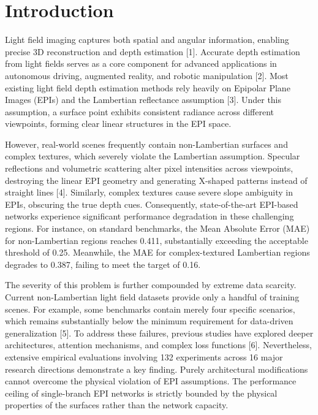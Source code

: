 \section{Introduction}

Light field imaging captures both spatial and angular information, enabling precise 3D reconstruction and depth estimation [1]. Accurate depth estimation from light fields serves as a core component for advanced applications in autonomous driving, augmented reality, and robotic manipulation [2]. Most existing light field depth estimation methods rely heavily on Epipolar Plane Images (EPIs) and the Lambertian reflectance assumption [3]. Under this assumption, a surface point exhibits consistent radiance across different viewpoints, forming clear linear structures in the EPI space.

However, real-world scenes frequently contain non-Lambertian surfaces and complex textures, which severely violate the Lambertian assumption. Specular reflections and volumetric scattering alter pixel intensities across viewpoints, destroying the linear EPI geometry and generating X-shaped patterns instead of straight lines [4]. Similarly, complex textures cause severe slope ambiguity in EPIs, obscuring the true depth cues. Consequently, state-of-the-art EPI-based networks experience significant performance degradation in these challenging regions. For instance, on standard benchmarks, the Mean Absolute Error (MAE) for non-Lambertian regions reaches 0.411, substantially exceeding the acceptable threshold of 0.25. Meanwhile, the MAE for complex-textured Lambertian regions degrades to 0.387, failing to meet the target of 0.16.

The severity of this problem is further compounded by extreme data scarcity. Current non-Lambertian light field datasets provide only a handful of training scenes. For example, some benchmarks contain merely four specific scenarios, which remains substantially below the minimum requirement for data-driven generalization [5]. To address these failures, previous studies have explored deeper architectures, attention mechanisms, and complex loss functions [6]. Nevertheless, extensive empirical evaluations involving 132 experiments across 16 major research directions demonstrate a key finding. Purely architectural modifications cannot overcome the physical violation of EPI assumptions. The performance ceiling of single-branch EPI networks is strictly bounded by the physical properties of the surfaces rather than the network capacity.

